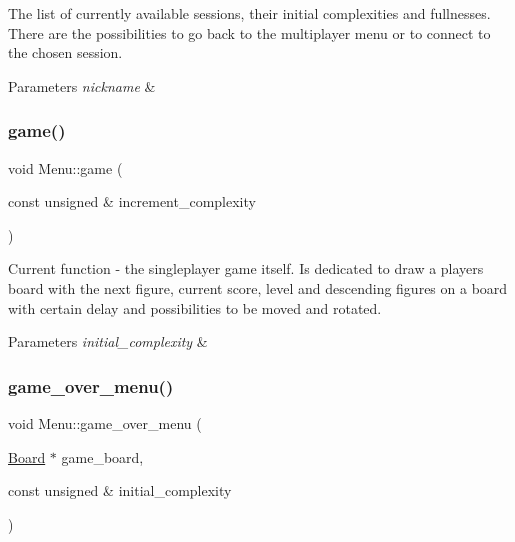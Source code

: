 The list of currently available sessions, their initial complexities and fullnesses. There are the possibilities to go back to the multiplayer menu or to connect to the chosen session. 


\begin{DoxyParams}{Parameters}
{\em nickname} & \\
\hline
\end{DoxyParams}
\mbox{\label{classMenu_a99a23768dd7c2069fd638aab42776b25}} 
\subsubsection{\texorpdfstring{game()}{game()}}
{\footnotesize\ttfamily void Menu\+::game (\begin{DoxyParamCaption}\item[{const unsigned \&}]{increment\+\_\+complexity }\end{DoxyParamCaption})}



Current function -\/ the singleplayer game itself. Is dedicated to draw a player\textquotesingle{}s board with the next figure, current score, level and descending figures on a board with certain delay and possibilities to be moved and rotated. 


\begin{DoxyParams}{Parameters}
{\em initial\+\_\+complexity} & \\
\hline
\end{DoxyParams}
\mbox{\label{classMenu_a85c7bd501d83ee524742ea546e0211d6}} 
\subsubsection{\texorpdfstring{game\+\_\+over\+\_\+menu()}{game\_over\_menu()}}
{\footnotesize\ttfamily void Menu\+::game\+\_\+over\+\_\+menu (\begin{DoxyParamCaption}\item[{\hyperlink{classBoard}{Board} $\ast$}]{game\+\_\+board,  }\item[{const unsigned \&}]{initial\+\_\+complexity }\end{DoxyParamCaption})}



